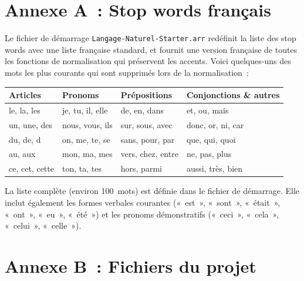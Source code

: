\documentclass[12pt,a4paper]{article}
\begin{document}
\newpage

\section*{Annexe A~: Stop words français}

Le fichier de démarrage \texttt{Langage\allowbreak-Naturel\allowbreak-Starter.arr} redéfinit la liste des stop words avec une liste française standard, et fournit une version française de toutes les fonctions de normalisation qui préservent les accents. Voici quelques-uns des mots les plus courants qui sont supprimés lors de la normalisation~:

\begin{center}
\begin{tabularx}{\textwidth}{X X X X}
  \toprule
  \textbf{Articles} & \textbf{Pronoms} & \textbf{Prépositions} & \textbf{Conjonctions \& autres} \\
  \midrule
  le, la, les & je, tu, il, elle & de, en, dans & et, ou, mais \\
  un, une, des & nous, vous, ils & sur, sous, avec & donc, or, ni, car \\
  du, de, d & on, me, te, se & sans, pour, par & que, qui, quoi \\
  au, aux & mon, ma, mes & vers, chez, entre & ne, pas, plus \\
  ce, cet, cette & ton, ta, tes & hors, parmi & aussi, très, bien \\
  \bottomrule
\end{tabularx}
\end{center}

La liste complète (environ 100~mots) est définie dans le fichier de démarrage. Elle inclut également les formes verbales courantes («~est~», «~sont~», «~était~», «~ont~», «~eu~», «~été~») et les pronoms démonstratifs («~ceci~», «~cela~», «~celui~», «~celle~»).

\section*{Annexe B~: Fichiers du projet}
\end{document}
